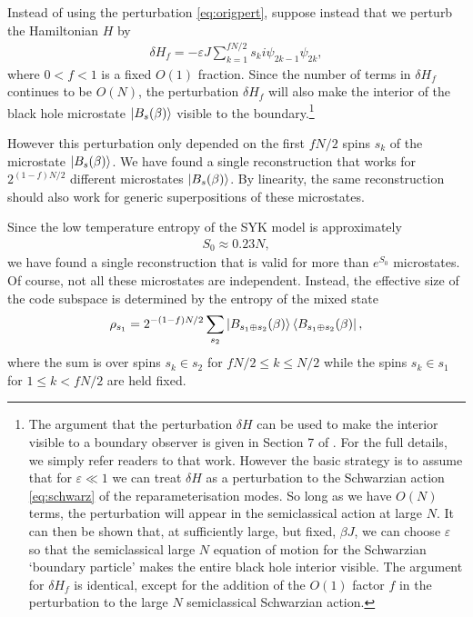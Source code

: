 \documentclass[12pt]{article}
\begin{document}
Instead of using the perturbation \eqref{eq:origpert}, suppose instead that we perturb the Hamiltonian $H$ by
\begin{align}
\delta H_f = - \varepsilon J  \sum_{k=1}^{f N/2} s_k i \psi_{2k-1} \psi_{2k},
\end{align}
where $0 < f < 1$ is a fixed $O(1)$ fraction. Since the number of terms in $\delta H_f$ continues to be $O(N)$,  the perturbation $\delta H_f$ will also make the interior of the black hole microstate $\ket{B_s(\beta)}$ visible to the boundary.\footnote{The argument that the perturbation $\delta H$ can be used to make the interior visible to a boundary observer is given in Section 7 of \cite{kourkoulou2017pure}. For the full details, we simply refer readers to that work. However the basic strategy is to assume that for $\varepsilon \ll 1$ we can treat $\delta H$ as a perturbation to the Schwarzian action \eqref{eq:schwarz} of the reparameterisation modes. So long as we have $O(N)$ terms, the perturbation will appear in the semiclassical action at large $N$. It can then be shown that, at sufficiently large, but fixed, $\beta J$, we can choose $\varepsilon$ so that the semiclassical large $N$ equation of motion for the Schwarzian `boundary particle' makes the entire black hole interior visible. The argument for $\delta H_f$ is identical, except for the addition of the $O(1)$ factor $f$ in the perturbation to the large $N$ semiclassical Schwarzian action.}

However this perturbation only depended on the first $f N/2$ spins $s_k$ of the microstate $\ket{B_s(\beta)}$. We have found a single reconstruction that works for $2^{(1-f)N/2}$ different microstates $\ket{B_s(\beta)}$. By linearity, the same reconstruction should also work for generic superpositions of these microstates.
 
Since the low temperature entropy of the SYK model is approximately
\begin{align}
S_0 \approx 0.23 N, 
\end{align}
we have found a single reconstruction that is valid for more than $e^{S_0}$ microstates. Of course, not all these microstates are independent. Instead, the effective size of the code subspace is determined by the entropy of the mixed state
\begin{align} \label{eq:mixture}
 \rho_{s_1} = 2^{-(1-f)N/2} \sum_{s_2} \ket{B_{s_1 \oplus s_2}(\beta)} \bra{B_{s_1 \oplus s_2}(\beta)}, 
\end{align}
where the sum is over spins $s_k \in s_2$ for $f N/2 \leq k \leq N /2$ while the spins $s_k \in s_1$ for $1 \leq k < f N/2$ are held fixed.
\end{document}
